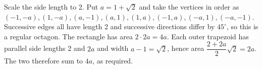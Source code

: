 Scale the side length to 2. Put $a=1+\sqrt2$ and take the vertices in order as $(-1,-a),(1,-a),(a,-1),(a,1),(1,a),(-1,a),(-a,1),(-a,-1)$. Successive edges all have length 2 and successive directions differ by $45^\circ$, so this is a regular octagon. The rectangle has area $2\cdot2a=4a$. Each outer trapezoid has parallel side lengths 2 and $2a$ and width $a-1=\sqrt2$, hence area $\dfrac{2+2a}{2}\sqrt2=2a$. The two therefore sum to $4a$, as required.
